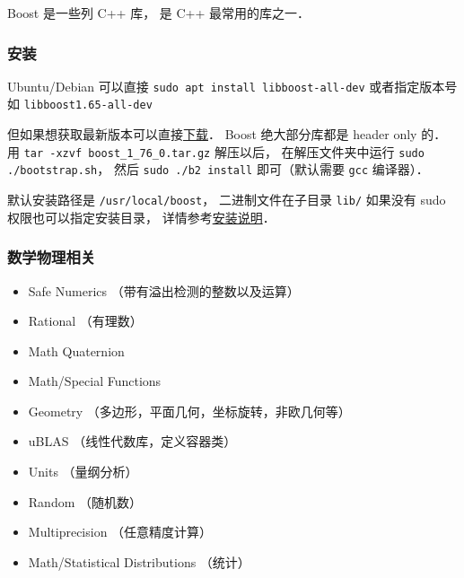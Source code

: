 
Boost 是一些列 C++ 库， 是 C++ 最常用的库之一．

\subsubsection{安装}
Ubuntu/Debian 可以直接 \verb|sudo apt install libboost-all-dev| 或者指定版本号如 \verb|libboost1.65-all-dev|

但如果想获取最新版本可以直接\href{https://www.boost.org/users/history/version_1_76_0.html}{下载}． Boost 绝大部分库都是 header only 的． 用 \verb|tar -xzvf boost_1_76_0.tar.gz| 解压以后， 在解压文件夹中运行 \verb|sudo ./bootstrap.sh|， 然后 \verb|sudo ./b2 install| 即可（默认需要 \verb|gcc| 编译器）．

默认安装路径是 \verb|/usr/local/boost|， 二进制文件在子目录 \verb|lib/| 如果没有 sudo 权限也可以指定安装目录， 详情参考\href{https://www.boost.org/doc/libs/1_76_0/more/getting_started/unix-variants.html#easy-build-and-install}{安装说明}．

\subsubsection{数学物理相关}
\begin{itemize}
\item Safe Numerics （带有溢出检测的整数以及运算）
\item Rational （有理数）
\item Math Quaternion
\item Math/Special Functions
\item Geometry （多边形，平面几何，坐标旋转，非欧几何等）
\item uBLAS （线性代数库，定义容器类）
\item Units （量纲分析）
\item Random （随机数）
\item Multiprecision （任意精度计算）
\item Math/Statistical Distributions （统计）
\end{itemize}

